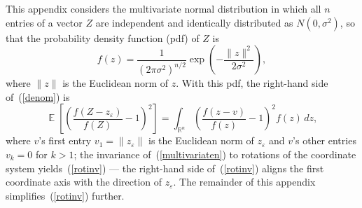 \documentclass[]{fairmeta}
\DeclareMathOperator{\E}{\mathop{}\mathbb{E}}
\renewcommand{\epsilon}{\varepsilon}
\begin{document}
This appendix considers the multivariate normal distribution
in which all $n$ entries of a vector $Z$ are
independent and identically distributed as $N(0, \sigma^2)$,
so that the probability density function (pdf) of $Z$ is
%
\begin{equation}
\label{multivariaten}
f(z) = \frac{1}{(2 \pi \sigma^2)^{n/2}}
       \exp\left(-\frac{\|z\|^2}{2\sigma^2}\right),
\end{equation}
%
where $\|z\|$ is the Euclidean norm of $z$.
With this pdf, the right-hand side of~(\ref{denom}) is
%
\begin{equation}
\label{rotinv}
\E\left[\left( \frac{f(Z-z_{\epsilon})}{f(Z)} - 1\right)^2 \right]
= \int_{\mathbb{R}^n} \left( \frac{f(z - v)}{f(z)} - 1 \right)^2 f(z) \, dz,
\end{equation}
%
where $v$'s first entry $v_1 = \|z_{\epsilon}\|$ is the Euclidean norm
of $z_{\epsilon}$ and $v$'s other entries $v_k = 0$ for $k > 1$;
the invariance of~(\ref{multivariaten}) to rotations of the coordinate system
yields~(\ref{rotinv}) --- the right-hand side of~(\ref{rotinv})
aligns the first coordinate axis with the direction of $z_{\epsilon}$.
The remainder of this appendix simplifies~(\ref{rotinv}) further.
\end{document}
